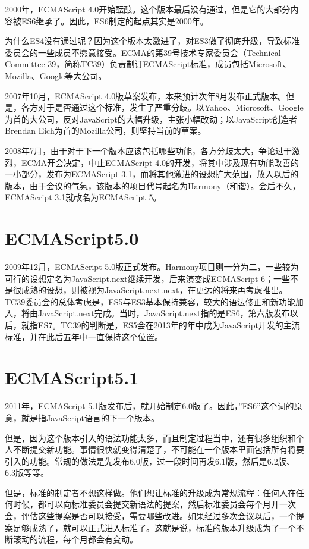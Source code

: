 2000年，ECMAScript 4.0开始酝酿。这个版本最后没有通过，但是它的大部分内容被ES6继承了。因此，ES6制定的起点其实是2000年。


为什么ES4没有通过呢？因为这个版本太激进了，对ES3做了彻底升级，导致标准委员会的一些成员不愿意接受。ECMA的第39号技术专家委员会（Technical Committee 39，简称TC39）负责制订ECMAScript标准，成员包括Microsoft、Mozilla、Google等大公司。

2007年10月，ECMAScript 4.0版草案发布，本来预计次年8月发布正式版本。但是，各方对于是否通过这个标准，发生了严重分歧。以Yahoo、Microsoft、Google为首的大公司，反对JavaScript的大幅升级，主张小幅改动；以JavaScript创造者Brendan Eich为首的Mozilla公司，则坚持当前的草案。

2008年7月，由于对于下一个版本应该包括哪些功能，各方分歧太大，争论过于激烈，ECMA开会决定，中止ECMAScript 4.0的开发，将其中涉及现有功能改善的一小部分，发布为ECMAScript 3.1，而将其他激进的设想扩大范围，放入以后的版本，由于会议的气氛，该版本的项目代号起名为Harmony（和谐）。会后不久，ECMAScript 3.1就改名为ECMAScript 5。

\section{ECMAScript5.0}


2009年12月，ECMAScript 5.0版正式发布。Harmony项目则一分为二，一些较为可行的设想定名为JavaScript.next继续开发，后来演变成ECMAScript 6；一些不是很成熟的设想，则被视为JavaScript.next.next，在更远的将来再考虑推出。TC39委员会的总体考虑是，ES5与ES3基本保持兼容，较大的语法修正和新功能加入，将由JavaScript.next完成。当时，JavaScript.next指的是ES6，第六版发布以后，就指ES7。TC39的判断是，ES5会在2013年的年中成为JavaScript开发的主流标准，并在此后五年中一直保持这个位置。

\section{ECMAScript5.1}


2011年，ECMAScript 5.1版发布后，就开始制定6.0版了。因此，”ES6”这个词的原意，就是指JavaScript语言的下一个版本。

但是，因为这个版本引入的语法功能太多，而且制定过程当中，还有很多组织和个人不断提交新功能。事情很快就变得清楚了，不可能在一个版本里面包括所有将要引入的功能。常规的做法是先发布6.0版，过一段时间再发6.1版，然后是6.2版、6.3版等等。

但是，标准的制定者不想这样做。他们想让标准的升级成为常规流程：任何人在任何时候，都可以向标准委员会提交新语法的提案，然后标准委员会每个月开一次会，评估这些提案是否可以接受，需要哪些改进。如果经过多次会议以后，一个提案足够成熟了，就可以正式进入标准了。这就是说，标准的版本升级成为了一个不断滚动的流程，每个月都会有变动。

